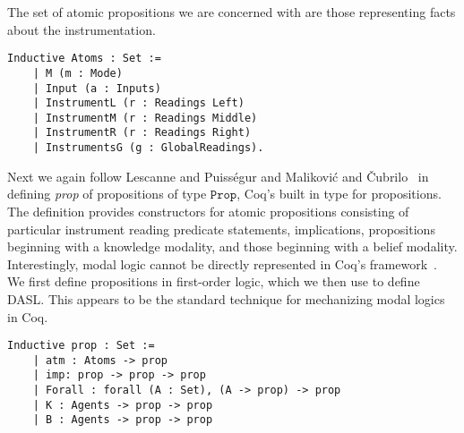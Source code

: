 The set of atomic propositions we are concerned with are those representing facts about the instrumentation.


\begin{tcolorbox}
	\begin{lstlisting}[language=Coq]
	Inductive Atoms : Set := 
	| M (m : Mode)
	| Input (a : Inputs) 
	| InstrumentL (r : Readings Left) 
	| InstrumentM (r : Readings Middle) 
	| InstrumentR (r : Readings Right)
	| InstrumentsG (g : GlobalReadings).
	\end{lstlisting}
\end{tcolorbox}

Next we  again follow Lescanne and Puiss\'egur \cite{lescanne, puislescanne} and Malikovi\'c and \v Cubrilo~\cite{delcoq1,delcoq2} in defining \emph{prop} of propositions of type $\mathtt{Prop}$, Coq's built in type for propositions. The definition provides constructors for atomic propositions consisting of particular instrument reading predicate statements, implications, propositions beginning with a knowledge modality, and those beginning with a belief modality. Interestingly, modal logic cannot be directly represented in Coq's framework~\cite{lescanne}. We first define propositions in first-order logic, which we then use to define DASL. This appears to be the standard technique for mechanizing modal logics in Coq. 

\begin{tcolorbox}
	\begin{lstlisting}[language=Coq]	
	Inductive prop : Set :=
	| atm : Atoms -> prop
	| imp: prop -> prop -> prop
	| Forall : forall (A : Set), (A -> prop) -> prop
	| K : Agents -> prop -> prop
	| B : Agents -> prop -> prop
	\end{lstlisting}
\end{tcolorbox}

